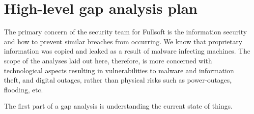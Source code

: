 \hypertarget{high-level-gap-analysis-plan}{%
\section{High-level gap analysis
plan}\label{high-level-gap-analysis-plan}}

The primary concern of the security team for Fullsoft is the information
security and how to prevent similar breaches from occurring. We know
that proprietary information was copied and leaked as a result of
malware infecting machines. The scope of the analyses laid out here,
therefore, is more concerned with technological aspects resulting in
vulnerabilities to malware and information theft, and digital outages,
rather than physical risks such as power-outages, flooding, etc.

The first part of a gap analysis is understanding the current state of
things.

